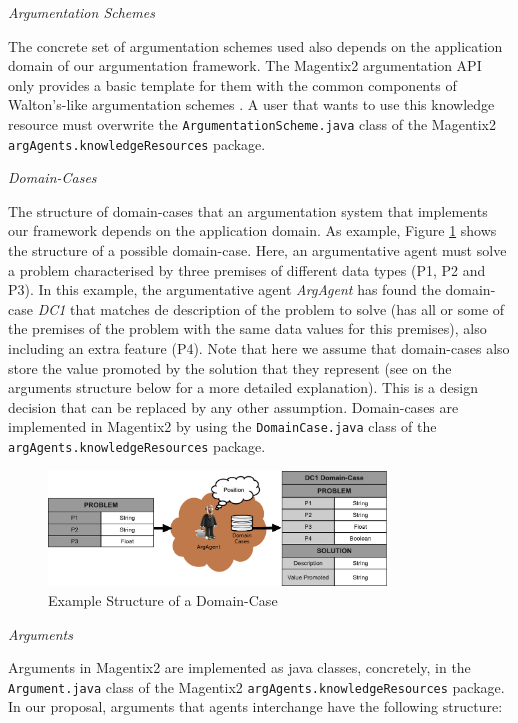 \textit{Argumentation Schemes}

The concrete set of argumentation schemes used also depends on the application domain of our argumentation framework. The Magentix2 argumentation API only provides a basic template for them with the common components of Walton's-like argumentation schemes \cite{Walton08}. A user that wants to use this knowledge resource must overwrite the \lstinline{ArgumentationScheme.java} class of the Magentix2 \lstinline{argAgents.knowledgeResources} package.

\textit{Domain-Cases}

The structure of domain-cases that an argumentation system that implements our framework depends on the application domain. As example, Figure \ref{fig:domCase} shows the structure of a possible domain-case. Here, an argumentative agent must solve a problem characterised by three premises of different data types (P1, P2 and P3). In this example, the argumentative agent \emph{ArgAgent} has found the domain-case \emph{DC1} that matches de description of the problem to solve (has all or some of the premises of the problem with the same data values for this premises), also including an extra feature (P4). Note that here we assume that domain-cases also store the value promoted by the solution that they represent (see on the arguments structure below for a more detailed explanation). This is a design decision that can be replaced by any other assumption. Domain-cases are implemented in Magentix2 by using the \lstinline{DomainCase.java} class of the \lstinline{argAgents.knowledgeResources} package.

\begin{figure}[t!]
  \begin{center}
    \includegraphics[width=0.8\textwidth]{ProgrammingAgents/images/domainCase}
 \end{center}
  \caption{Example Structure of a Domain-Case}
\label{fig:domCase}
\end{figure}

\textit{Arguments}

Arguments in Magentix2 are implemented as java classes, concretely, in the \lstinline{Argument.java} class of the Magentix2 \lstinline{argAgents.knowledgeResources} package. In our proposal, arguments that agents interchange have the following  structure:

